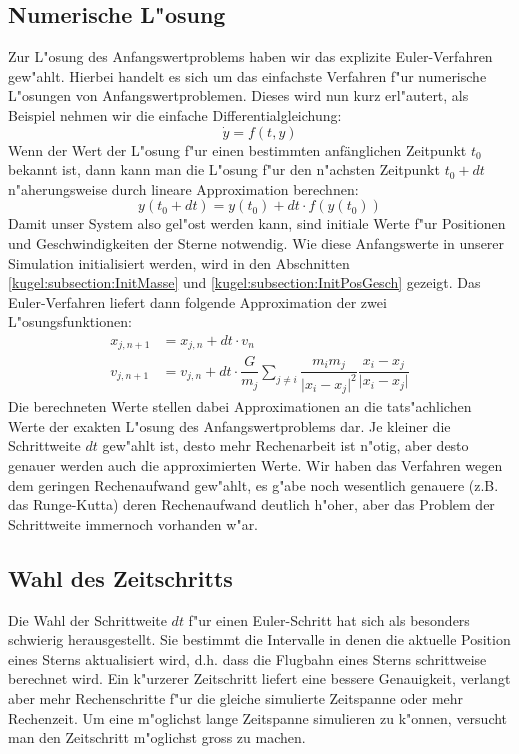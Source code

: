 \begin{refsection}
	\subsection{Numerische L"osung}
    Zur L"osung des Anfangswertproblems haben wir das explizite Euler-Verfahren gew"ahlt. Hierbei handelt es sich um das einfachste Verfahren f"ur numerische L"osungen von Anfangswertproblemen. Dieses wird nun kurz erl"autert, als Beispiel nehmen wir die einfache Differentialgleichung:
    \begin{equation}
    \dot{y} = f(t,y)
    \label{kugel:Formel:DGLbsp}
    \end{equation}
    Wenn der Wert der L"osung f"ur einen bestimmten anfänglichen Zeitpunkt $t_0$ bekannt ist, dann kann man die L"osung f"ur den n"achsten Zeitpunkt $t_0 + dt$ n"aherungsweise durch lineare Approximation berechnen:
    \begin{equation}
    y(t_0 + dt) = y(t_0) + dt \cdot f(y(t_0))
    \label{kugel:Formel:EulerAllg}
    \end{equation}
    Damit unser System also gel"ost werden kann, sind initiale Werte f"ur Positionen und Geschwindigkeiten der Sterne notwendig. 
    Wie diese Anfangswerte in unserer Simulation initialisiert werden, wird in den Abschnitten \ref{kugel:subsection:InitMasse} und \ref{kugel:subsection:InitPosGesch} gezeigt. Das Euler-Verfahren liefert dann folgende Approximation der zwei L"osungsfunktionen:
    \begin{equation}   
    \begin{aligned}
	     x_{j,n+1} &=  x_{j,n} + dt \cdot  v_n \\
	     v_{j,n+1} &=  v_{j,n} + dt \cdot \dfrac{G}{m_j} \sum_{j \neq i} \dfrac{m_i m_j}{\lvert x_i - x_j \lvert^2} \dfrac{x_i - x_j}{\lvert x_i - x_j \lvert}
    \end{aligned}
    \label{kugel:Formel:EulerSys}
    \end{equation}
    Die berechneten Werte stellen dabei Approximationen an die tats"achlichen Werte der exakten L"osung des Anfangswertproblems dar. Je kleiner die Schrittweite $dt$ gew"ahlt ist, desto mehr Rechenarbeit ist n"otig, aber desto genauer werden auch die approximierten Werte.
    Wir haben das Verfahren wegen dem geringen Rechenaufwand gew"ahlt, es g"abe noch wesentlich genauere (z.B. das Runge-Kutta) deren Rechenaufwand deutlich h"oher, aber das Problem der Schrittweite immernoch vorhanden w"ar.
    
    \subsection{Wahl des Zeitschritts}
    Die Wahl der Schrittweite $dt$ f"ur einen Euler-Schritt hat sich als besonders schwierig herausgestellt. Sie bestimmt die Intervalle in denen die aktuelle Position eines Sterns aktualisiert wird, d.h. dass die Flugbahn eines Sterns schrittweise berechnet wird. Ein k"urzerer Zeitschritt liefert eine bessere Genauigkeit, verlangt aber mehr Rechenschritte f"ur die gleiche simulierte Zeitspanne oder mehr Rechenzeit. Um eine m"oglichst lange Zeitspanne simulieren zu k"onnen, versucht man den Zeitschritt m"oglichst gross zu machen.
    

\end{refsection}

